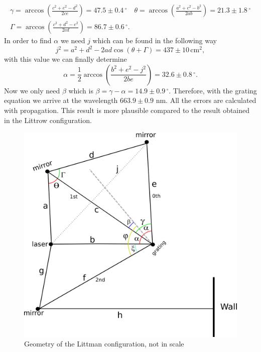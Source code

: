 \documentclass[a4paper,10pt]{article}
\begin{document}
\begin{multline}\gamma = \arccos\left(\frac{c^2+e^2-d^2}{2ce}\right) = 47.5\pm0.4\,^\circ \quad  \theta = \arccos\left(\frac{a^2+c^2-b^2}{2ab}\right) = 21.3\pm 1.8\,^\circ \\ \Gamma = \arccos\left(\frac{c^2+d^2-e^2}{2cd}\right)=86.7\pm 0.6\,^\circ.\end{multline}
In order to find $\alpha$ we need $j$ which can be found in the following way
\begin{equation}j^2 = a^2 + d^2 - 2ad\cos(\theta+\Gamma) = 437\pm 10 \, \text{cm}^2,\end{equation}
with this value we can finally determine
\begin{equation}\alpha = \frac{1}{2}\arccos\left(\frac{b^2+e^2-j^2}{2be}\right) = 32.6\pm 0.8\,^\circ.\end{equation}
Now we only need $\beta$ which is $\beta = \gamma -\alpha = 14.9\pm 0.9\,^\circ $. Therefore, with the grating equation we arrive at the wavelength $663.9\pm 0.9$ nm. All the errors are calculated with propagation. This result is more plausible compared to the result obtained in the Littrow configuration.

\begin{figure}[H]
\centering
\includegraphics[width=.7\textwidth]{geometry.png}
\caption{Geometry of the Littman configuration, not in scale}\label{geometry}
\end{figure}
\end{document}
